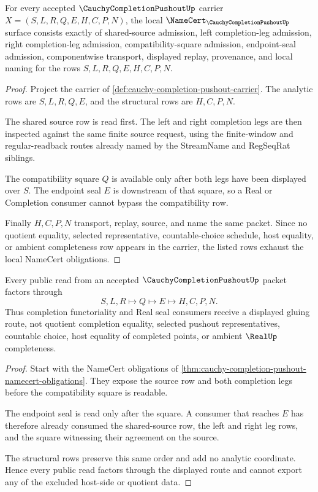 \begin{theorem}
\label{thm:cauchy-completion-pushout-namecert-obligations}
For every accepted $\CauchyCompletionPushoutUp$ carrier $X=(S,L,R,Q,E,H,C,P,N)$, the local $\NameCert_{\CauchyCompletionPushoutUp}$ surface consists exactly of shared-source admission, left completion-leg admission, right completion-leg admission, compatibility-square admission, endpoint-seal admission, componentwise transport, displayed replay, provenance, and local naming for the rows $S,L,R,Q,E,H,C,P,N$.
\end{theorem}
\begin{proof}
Project the carrier of \autoref{def:cauchy-completion-pushout-carrier}. The analytic rows are $S,L,R,Q,E$, and the structural rows are $H,C,P,N$.

The shared source row is read first. The left and right completion legs are then inspected against the same finite source request, using the finite-window and regular-readback routes already named by the StreamName and RegSeqRat siblings.

The compatibility square $Q$ is available only after both legs have been displayed over $S$. The endpoint seal $E$ is downstream of that square, so a Real or Completion consumer cannot bypass the compatibility row.

Finally $H,C,P,N$ transport, replay, source, and name the same packet. Since no quotient equality, selected representative, countable-choice schedule, host equality, or ambient completeness row appears in the carrier, the listed rows exhaust the local NameCert obligations.
\end{proof}

\begin{theorem}
\label{thm:cauchy-completion-pushout-nonescape}
Every public read from an accepted $\CauchyCompletionPushoutUp$ packet factors through
$$
S,L,R \longmapsto Q \longmapsto E \longmapsto H,C,P,N .
$$
Thus completion functoriality and Real seal consumers receive a displayed gluing route, not quotient completion equality, selected pushout representatives, countable choice, host equality of completed points, or ambient $\RealUp$ completeness.
\end{theorem}
\begin{proof}
Start with the NameCert obligations of \autoref{thm:cauchy-completion-pushout-namecert-obligations}. They expose the source row and both completion legs before the compatibility square is readable.

The endpoint seal is read only after the square. A consumer that reaches $E$ has therefore already consumed the shared-source row, the left and right leg rows, and the square witnessing their agreement on the source.

The structural rows preserve this same order and add no analytic coordinate. Hence every public read factors through the displayed route and cannot export any of the excluded host-side or quotient data.
\end{proof}

